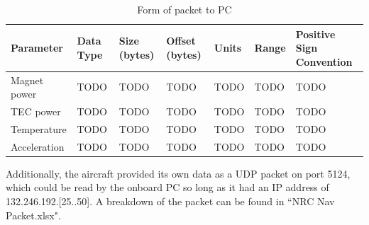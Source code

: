 \documentclass{article}
\begin{document}
\begin{table}[!ht]
	\centering
	\begin{tabular}{ | m{3cm} | m{2cm} | m{2cm} | m{2cm}| m{2cm}| m{2cm}| m{2cm}|  } 
		\hline
		Parameter & Data Type & Size (bytes) & Offset (bytes) & Units & Range & Positive Sign Convention \\
		\hline
		Magnet power & TODO & TODO & TODO & TODO & TODO & TODO \\ 
		\hline
	    TEC power & TODO & TODO & TODO & TODO & TODO & TODO \\ 
		\hline
		Temperature & TODO & TODO & TODO & TODO & TODO & TODO \\ 
		\hline
		Acceleration & TODO & TODO & TODO & TODO & TODO & TODO \\ 
		\hline
	\end{tabular}
	\caption{Form of packet to PC}
	\label{tab:PCPacketFormat}
\end{table}

Additionally, the aircraft provided its own data as a UDP packet on port 5124, which could be read by the onboard PC so long as it had an IP address of 132.246.192.[25..50]. A breakdown of the packet can be found in ``NRC Nav Packet.xlsx".
\clearpage

\end{document}

